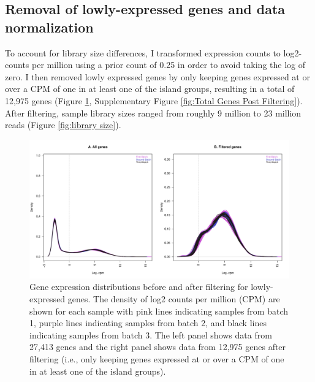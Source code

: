 \documentclass[12pt,a4paper,titlepage,twoside,openright]{book}
\begin{document}
\begin{mainmatter}
{{\section{Removal of lowly-expressed genes and data normalization}
To account for library size differences, I transformed expression counts to log2-counts per million using a prior count of 0.25 in order to avoid taking the log of zero. I then removed lowly expressed genes by only keeping genes expressed at or over a CPM of one in at least one of the island groups, resulting in a total of 12,975 genes (Figure \ref{fig:library density after removal of lowly-expressed genes}, Supplementary Figure \ref{fig:Total Genes Post Filtering}). After filtering, sample library sizes ranged from roughly 9 million to 23 million reads (Figure \ref{fig:library size}).

\begin{figure}[htb!]
\centering
\includegraphics[width=\textwidth,height=\textheight,keepaspectratio]{Figures/libraryDensity_afterFiltering_indoRNA.pdf}
\caption{Gene expression distributions before and after filtering for lowly-expressed genes. The density of log2 counts per million (CPM) are shown for each sample with pink lines indicating samples from batch 1, purple lines indicating samples from batch 2, and black lines indicating samples from batch 3. The left panel shows data from 27,413 genes and the right panel shows data from 12,975 genes after filtering (i.e., only keeping genes expressed at or over a CPM of one in at least one of the island groups).}
\label{fig:library density after removal of lowly-expressed genes}
\end{figure}

}}
\end{mainmatter}
\end{document}
